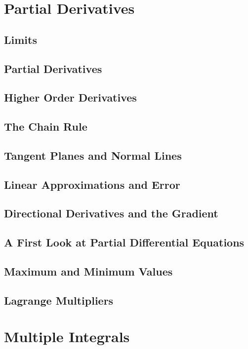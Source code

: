 \documentclass[12pt,letterpaper, openany]{book}
\begin{document}
\chapter{Partial Derivatives}
\section{Limits}

\section{Partial Derivatives}

\section{Higher Order Derivatives}

\section{The Chain Rule}

\section{Tangent Planes and Normal Lines}

\section{Linear Approximations and Error}

\section{Directional Derivatives and the Gradient}

\section{A First Look at Partial Differential Equations}

\section{Maximum and Minimum Values}

\section{Lagrange Multipliers}


\chapter{Multiple Integrals}
\end{document}
